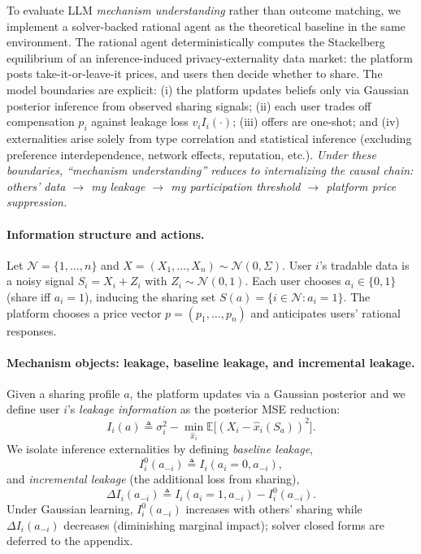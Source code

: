 \documentclass[sigconf,anonymous,review]{acmart}
\theoremstyle{definition}
\begin{document}
To evaluate LLM \emph{mechanism understanding} rather than outcome matching, we implement a solver-backed rational agent as the theoretical baseline in the same environment. The rational agent deterministically computes the Stackelberg equilibrium of an inference-induced privacy-externality data market: the platform posts take-it-or-leave-it prices, and users then decide whether to share. The model boundaries are explicit: (i) the platform updates beliefs only via Gaussian posterior inference from observed sharing signals; (ii) each user trades off compensation $p_i$ against leakage loss $v_i I_i(\cdot)$; (iii) offers are one-shot; and (iv) externalities arise solely from type correlation and statistical inference (excluding preference interdependence, network effects, reputation, etc.). \textit{Under these boundaries, ``mechanism understanding'' reduces to internalizing the causal chain: others' data \(\rightarrow\) my leakage \(\rightarrow\) my participation threshold \(\rightarrow\) platform price suppression.}

\paragraph{Information structure and actions.}
Let $\mathcal{N}=\{1,\ldots,n\}$ and $X=(X_1,\ldots,X_n)\sim\mathcal{N}(0,\Sigma)$.
User $i$'s tradable data is a noisy signal $S_i=X_i+Z_i$ with $Z_i\sim\mathcal{N}(0,1)$.
Each user chooses $a_i\in\{0,1\}$ (share iff $a_i=1$), inducing the sharing set
$S(a)=\{i\in\mathcal{N}:a_i=1\}$.
The platform chooses a price vector $p=(p_1,\ldots,p_n)$ and anticipates users' rational responses.

\paragraph{Mechanism objects: leakage, baseline leakage, and incremental leakage.}
Given a sharing profile $a$, the platform updates via a Gaussian posterior and we define user $i$'s \emph{leakage information} as the posterior MSE reduction:
\begin{equation}
I_i(a)\triangleq \sigma_i^2-\min_{\hat x_i}\mathbb{E}\big[(X_i-\hat x_i(S_a))^2\big].
\label{eq:leak_def}
\end{equation}
We isolate inference externalities by defining \emph{baseline leakage},
\begin{equation}
I_i^{0}(a_{-i})\triangleq I_i(a_i=0,a_{-i}),
\label{eq:baseline_leak}
\end{equation}
and \emph{incremental leakage} (the additional loss from sharing),
\begin{equation}
\Delta I_i(a_{-i})\triangleq I_i(a_i=1,a_{-i})-I_i^{0}(a_{-i}).
\label{eq:delta_def}
\end{equation}
Under Gaussian learning, $I_i^{0}(a_{-i})$ increases with others' sharing while $\Delta I_i(a_{-i})$ decreases (diminishing marginal impact); solver closed forms are deferred to the appendix.
\end{document}
